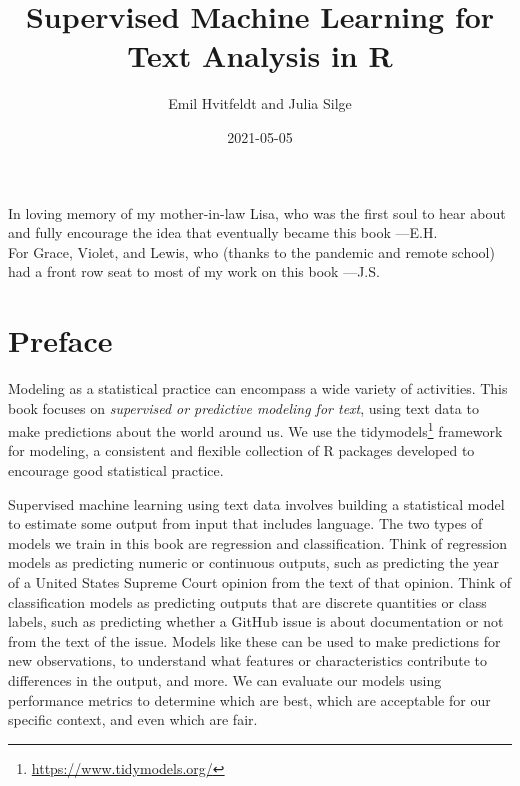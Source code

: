 \documentclass[
]{krantz}
\title{Supervised Machine Learning for Text Analysis in R}
\author{Emil Hvitfeldt and Julia Silge}
\date{2021-05-05}
\DeclareRobustCommand{\href}[2]{#2\footnote{\url{#1}}}
\renewcommand{\href}[2]{#2\footnote{\url{#1}}}
\begin{document}
\maketitle


\thispagestyle{empty}

\begin{center}
In loving memory of my mother-in-law Lisa, 
who was the first soul to hear about and fully encourage the idea that eventually became this book
---E.H.
\\[2in]

For Grace, Violet, and Lewis, 
who (thanks to the pandemic and remote school) had a front row seat to most of my work on this book
---J.S.

\end{center}

\setlength{\abovedisplayskip}{-5pt}
\setlength{\abovedisplayshortskip}{-5pt}

{
\hypersetup{linkcolor=}
\setcounter{tocdepth}{2}
\tableofcontents
}
\mainmatter

\hypertarget{preface}{%
\chapter*{Preface}\label{preface}}


Modeling as a statistical practice can encompass a wide variety of activities. This book focuses on \emph{supervised or predictive modeling for text}, using text data to make predictions about the world around us. We use the \href{https://www.tidymodels.org/}{tidymodels} framework for modeling, a consistent and flexible collection of R packages developed to encourage good statistical practice.

Supervised machine learning using text data involves building a statistical model to estimate some output from input that includes language. The two types of models we train in this book are regression and classification. Think of regression models as predicting numeric or continuous outputs, such as predicting the year of a United States Supreme Court opinion from the text of that opinion. Think of classification models as predicting outputs that are discrete quantities or class labels, such as predicting whether a GitHub issue is about documentation or not from the text of the issue. Models like these can be used to make predictions for new observations, to understand what features or characteristics contribute to differences in the output, and more. We can evaluate our models using performance metrics to determine which are best, which are acceptable for our specific context, and even which are fair.
\end{document}
